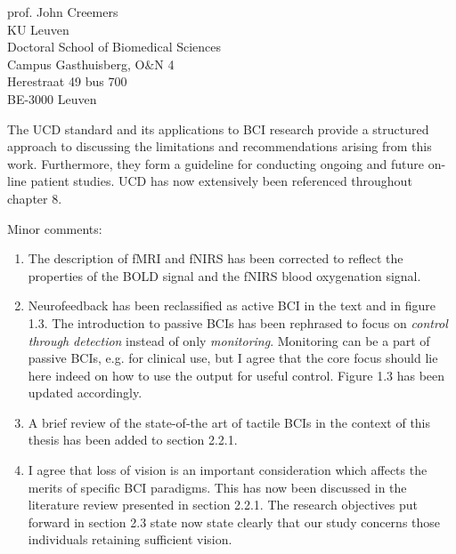 \documentclass{letter}
\begin{document}
\begin{letter}{%
	prof. John Creemers \\
	KU Leuven \\
	Doctoral School of Biomedical Sciences \\
	Campus Gasthuisberg, O\&N 4 \\
	Herestraat 49 bus 700 \\
	BE-3000 Leuven

}
\begin{enumerate}
    The UCD standard and its applications to BCI research provide a structured
    approach to discussing the limitations and recommendations arising from this
    work.
    Furthermore, they form a guideline for conducting ongoing and future on-line patient
    studies.
    UCD has now extensively been referenced throughout chapter 8.
\end{enumerate}
Minor comments:
\begin{enumerate}
  \item The description of fMRI and fNIRS has been
    corrected to reflect the properties of the BOLD signal and the fNIRS blood
    oxygenation signal.
  \item	Neurofeedback has been reclassified as active BCI in the text and in
	  figure 1.3.
    The introduction to passive BCIs has been rephrased to focus on
    \emph{control through detection} instead of only \emph{monitoring}.
    Monitoring can be a part of passive BCIs, e.g. for clinical use, but I
    agree that the core focus should lie here indeed on how to use the output
    for useful control.
    Figure 1.3 has been updated accordingly.
  \item A brief review of the state-of-the art of tactile BCIs in the
    context of this thesis has been added to section 2.2.1.
  \item I agree that loss of vision is an important consideration which affects
    the merits of specific BCI paradigms. This has now been discussed in the
    literature review presented in section 2.2.1. The research objectives
    put forward in section 2.3 state now state clearly that our study concerns
    those individuals retaining sufficient vision.
\end{enumerate}


\end{letter}
\end{document}
